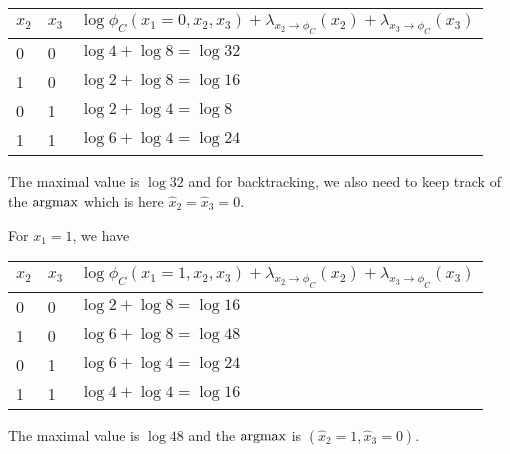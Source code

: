 \begin{exenumerate}
\begin{solution}
\begin{center}
\begin{tabular}{lll}
           \toprule
           $x_2$ & $x_3$ & $\log \phi_C(x_1=0, x_2, x_3) + \lambda_{x_2 \to \phi_C}(x_2) + \lambda_{x_3 \to \phi_C}(x_3)$\\
           \midrule
            0 & 0 & $\log 4 + \log 8 = \log 32$  \\
            1 & 0 & $\log 2 + \log 8 = \log 16$ \\
            0 & 1 & $\log 2 + \log 4 = \log 8$  \\
            1 & 1 & $\log 6 + \log 4 = \log 24$ \\
           \bottomrule
         \end{tabular}
       \end{center}
       The maximal value is $\log 32$ and for backtracking, we also
       need to keep track of the $\operatorname*{\mathrm{argmax}}$ which is here
       $\hat{x}_2=\hat{x}_3=0$.

       For $x_1=1$, we have
        \begin{center}
         \begin{tabular}{lll}
           \toprule
           $x_2$ & $x_3$ & $\log \phi_C(x_1=1, x_2, x_3) + \lambda_{x_2 \to \phi_C}(x_2) + \lambda_{x_3 \to \phi_C}(x_3)$\\
           \midrule
           0 & 0 & $\log 2 + \log 8 = \log 16 $  \\
           1 & 0 & $\log 6 + \log 8 = \log 48$\\
           0 & 1 & $\log 6 + \log 4 = \log 24$ \\
           1 & 1 & $\log 4 + \log 4 = \log 16$ \\
           \bottomrule
         \end{tabular}
       \end{center}
        The maximal value is $\log 48$ and the $\operatorname*{\mathrm{argmax}}$ is $(\hat{x}_2=1, \hat{x}_3=0)$.
        

\end{solution}
\end{exenumerate}

